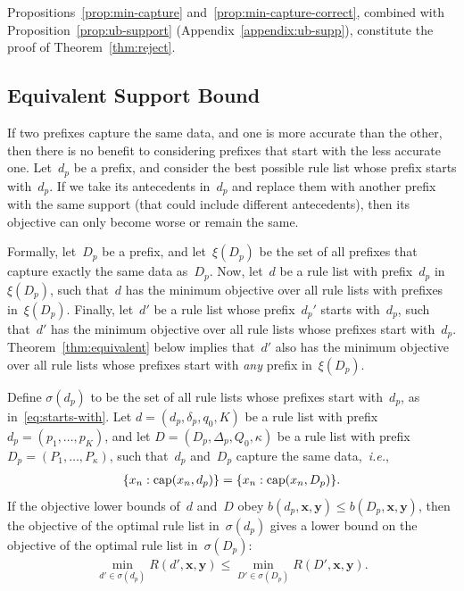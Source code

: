 \documentclass[twoside,11pt]{article}
\def\ie{{\it i.e.},~}
\newcommand{\x}{\mathbf{x}}
\newcommand{\y}{\mathbf{y}}
\def\RL{{d}}
\def\Prefix{d_p}
\def\Labels{\delta_p}
\def\Default{q_0}
\def\RLB{{D}}
\def\PrefixB{D_p}
\def\LabelsB{\Delta_p}
\def\DefaultB{Q_0}
\def\Obj{R}
\def\Cap{\textnormal{cap}}
\def\StartsWith{\sigma}
\newcommand{\nn}{\nonumber}
\begin{document}
\begin{arxiv}
Propositions~\ref{prop:min-capture} and~\ref{prop:min-capture-correct},
combined with Proposition~\ref{prop:ub-support} (Appendix~\ref{appendix:ub-supp}),
constitute the proof of Theorem~\ref{thm:reject}.
\end{arxiv}

\subsection{Equivalent Support Bound}
\label{sec:equivalent}

If two prefixes capture the same data, and one is more accurate than the other,
then there is no benefit to considering prefixes that start with the less accurate one.
%
Let~$\Prefix$ be a prefix,
and consider the best possible rule list whose prefix starts with~$\Prefix$.
%
If we take its antecedents in~$\Prefix$ and replace them with another prefix
with the same support (that could include different antecedents),
then its objective can only become worse or remain the same.

Formally, let~$\PrefixB$ be a prefix, and let~$\xi(\PrefixB)$ be the set
of all prefixes that capture exactly the same data as~$\PrefixB$.
%
Now, let~$\RL$ be a rule list with prefix~$\Prefix$
in~$\xi(\PrefixB)$, such that~$\RL$ has the minimum objective
over all rule lists with prefixes in~$\xi(\PrefixB)$.
%
Finally, let~$\RL'$ be a rule list whose prefix~$\Prefix'$
starts with~$\Prefix$, such that~$\RL'$ has the minimum objective
over all rule lists whose prefixes start with~$\Prefix$.
%
Theorem~\ref{thm:equivalent} below implies that~$\RL'$ also has
the minimum objective over all rule lists whose prefixes start with
\emph{any} prefix in~$\xi(\PrefixB)$.

\begin{theorem}
\label{thm:equivalent}
Define $\StartsWith(\Prefix)$ to be the set of all rule lists
whose prefixes start with~$\Prefix$, as in~\eqref{eq:starts-with}.
%
Let ${\RL = (\Prefix, \Labels, \Default, K)}$
be a rule list with prefix ${\Prefix = (p_1, \dots, p_K)}$,
and let ${\RLB = (\PrefixB, \LabelsB, \DefaultB, \kappa)}$
be a rule list with prefix ${\PrefixB = (P_1, \dots, P_{\kappa})}$,
such that~$\Prefix$ and~$\PrefixB$ capture the same data,~\ie
\begin{align}
\{x_n : \Cap(x_n, \Prefix)\} = \{x_n : \Cap(x_n, \PrefixB)\}. \nn
\end{align}
%
If the objective lower bounds of~$\RL$ and~$\RLB$
obey ${b(\Prefix, \x, \y) \le b(\PrefixB, \x, \y)}$,
then the objective of the optimal rule list in~$\StartsWith(\Prefix)$ gives a
lower bound on the objective of the optimal rule list in~$\StartsWith(\PrefixB)$:
\begin{align}
\min_{\RL' \in \StartsWith(\Prefix)} \Obj(\RL', \x, \y)
\le \min_{\RLB' \in \StartsWith(\PrefixB)} \Obj(\RLB', \x, \y).
\label{eq:equivalent}
\end{align}
\end{theorem}
\end{document}
